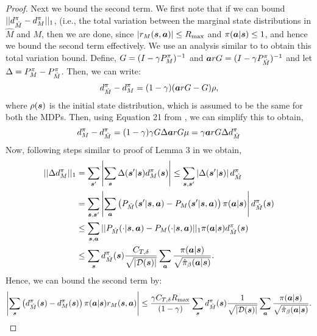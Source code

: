 \begin{proof}
Next we bound the second term. We first note that if we can bound $\vert\vert d^\pi_{\hat{M}} - d^\pi_M \vert\vert_1$, (i.e., the total variation between the marginal state distributions in $\hat{M}$ and $M$, then we are done, since $|r_M(\boldsymbol{s}, \boldsymbol{a})| \leq R_{\max}$ and $\pi(\boldsymbol{a}|\boldsymbol{s}) \leq 1$, and hence we bound the second term effectively. We use an analysis similar to \citet{achiam2017constrained} to obtain this total variation bound. Define, $G = (I - \gamma P^{\pi}_{M})^{-1}$ and $\boldsymbol{a}r{G} = (I - \gamma P^\pi_{\hat{M}})^{-1}$ and let $\Delta = P^\pi_{M} - P^{\pi}_{\hat{M}}$. Then, we can write:
\begin{equation*}
    d^\pi_{\hat{M}} - d^\pi_{M} = (1 - \gamma) (\boldsymbol{a}r{G} - G) \rho,
\end{equation*}
where $\rho(\boldsymbol{s})$ is the initial state distribution, which is assumed to be the same for both the MDPs. Then, using Equation 21 from \citet{achiam2017constrained}, we can simplify this to obtain,
\begin{equation*}
    d^\pi_{{M}} - d^\pi_{\hat{M}} = (1 - \gamma) \gamma {G} \Delta \boldsymbol{a}r{G} \mu = \gamma \boldsymbol{a}r{G} \Delta d^\pi_{\hat{M}}
\end{equation*}
Now, following steps similar to proof of Lemma 3 in \citet{achiam2017constrained} we obtain,
\begin{align*}
    \vert\vert \Delta d^\pi_M||_{1} &= \sum_{\boldsymbol{s}'} \left\vert \sum_{\boldsymbol{s}} \Delta(\boldsymbol{s}'|\boldsymbol{s}) d^\pi_{M}(\boldsymbol{s}) \right\vert \leq \sum_{\boldsymbol{s}, \boldsymbol{s}'} \left\vert \Delta(\boldsymbol{s}'|\boldsymbol{s}) \right\vert d^\pi_{\hat{M}}\\
    &= \sum_{\boldsymbol{s}, \boldsymbol{s}'} \left\vert \sum_{\boldsymbol{a}} \left(P_{\hat{M}}(\boldsymbol{s}'|\boldsymbol{s}, \boldsymbol{a}) - P_{M}(\boldsymbol{s}'|\boldsymbol{s}, \boldsymbol{a}) \right) \pi(\boldsymbol{a}|\boldsymbol{s}) \right\vert d^\pi_{\hat{M}}(\boldsymbol{s}) \\
    &\leq \sum_{\boldsymbol{s}, \boldsymbol{a}} \vert\vert P_{\hat{M}}(\cdot|\boldsymbol{s}, \boldsymbol{a}) - P_M(\cdot|\boldsymbol{s}, \boldsymbol{a}) \vert\vert_{1} \pi(\boldsymbol{a}|\boldsymbol{s}) d^\pi_{\hat{M}}(\boldsymbol{s})\\
    &\leq \sum_{\boldsymbol{s}} d^\pi_{\hat{M}}(\boldsymbol{s}) \frac{C_{T, \delta}}{\sqrt{|\mathcal{D}(\boldsymbol{s})|}} \sum_{\boldsymbol{a}}  \frac{\pi(\boldsymbol{a}|\boldsymbol{s})}{\sqrt{\hat{\pi}_\beta(\boldsymbol{a}|\boldsymbol{s})}}.
\end{align*}
Hence, we can bound the second term by:
\begin{align*}
    \left\vert \sum_{\boldsymbol{s}} \left(d^\pi_{\hat{M}}(\boldsymbol{s}) - d^\pi_{{M}}(\boldsymbol{s}) \right) \pi(\boldsymbol{a}|\boldsymbol{s}) r_M(\boldsymbol{s}, \boldsymbol{a}) \right\vert \leq \frac{\gamma C_{T, \delta} R_{\max}}{(1 - \gamma)} \sum_{\boldsymbol{s}} d^\pi_{\hat{M}}(\boldsymbol{s}) \frac{1}{\sqrt{|\mathcal{D}(\boldsymbol{s})|}} \sum_{\boldsymbol{a}}  \frac{\pi(\boldsymbol{a}|\boldsymbol{s})}{\sqrt{\hat{\pi}_\beta(\boldsymbol{a}|\boldsymbol{s})}}.
\end{align*}


\end{proof}
